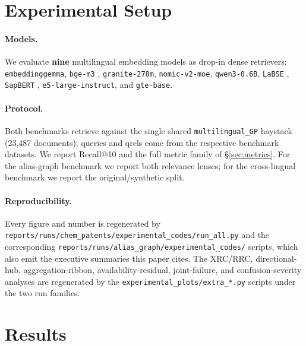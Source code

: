 \documentclass[11pt]{article}
\begin{document}
\section{Experimental Setup}
\label{sec:setup}

\paragraph{Models.}
We evaluate \textbf{nine} multilingual embedding models as drop-in dense
retrievers: \texttt{embeddinggemma}, \texttt{bge-m3} \citep{bgem3_2024},
\texttt{granite-278m}, \texttt{nomic-v2-moe}, \texttt{qwen3-0.6B},
\texttt{LaBSE} \citep{labse2022}, \texttt{SapBERT} \citep{sapbert2021},
\texttt{e5-large-instruct}, and \texttt{gte-base}.

\paragraph{Protocol.}
Both benchmarks retrieve against the single shared \texttt{multilingual\_GP}
haystack (23{,}487 documents); queries and qrels come from the respective
benchmark datasets. We report Recall@10 and the full metric family of
\S\ref{sec:metrics}. For the alias-graph benchmark we report both relevance
lenses; for the cross-lingual benchmark we report the original/synthetic split.

\paragraph{Reproducibility.}
Every figure and number is regenerated by
\texttt{reports/runs/chem\_patents/experimental\_codes/run\_all.py} and the
corresponding \texttt{reports/runs/alias\_graph/experimental\_codes/} scripts,
which also emit the executive summaries this paper cites. The XRC/RRC,
directional-hub, aggregation-ribbon, availability-residual, joint-failure, and
confusion-severity analyses are regenerated by the
\texttt{experimental\_plots/extra\_*.py} scripts under the two run families.

\section{Results}
\label{sec:results}
\end{document}
